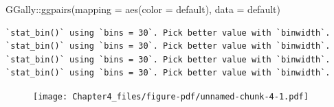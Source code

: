 \documentclass[
  letterpaper,
  DIV=11,
  numbers=noendperiod]{scrreprt}
\newenvironment{Shaded}{\begin{snugshade}}{\end{snugshade}}
\newcommand{\AttributeTok}[1]{\textcolor[rgb]{0.65,0.35,0.00}{#1}}
\newcommand{\FunctionTok}[1]{\textcolor[rgb]{0.02,0.16,0.49}{#1}}
\newcommand{\NormalTok}[1]{\textcolor[rgb]{0.33,0.33,0.33}{#1}}
\newcommand{\SpecialCharTok}[1]{\textcolor[rgb]{0.00,0.46,0.62}{#1}}
\begin{document}
\begin{Shaded}
\begin{Highlighting}[]
\NormalTok{GGally}\SpecialCharTok{::}\FunctionTok{ggpairs}\NormalTok{(}\AttributeTok{mapping =} \FunctionTok{aes}\NormalTok{(}\AttributeTok{color =}\NormalTok{ default), }\AttributeTok{data =}\NormalTok{ default)}
\end{Highlighting}
\end{Shaded}

\begin{verbatim}
`stat_bin()` using `bins = 30`. Pick better value with `binwidth`.
`stat_bin()` using `bins = 30`. Pick better value with `binwidth`.
`stat_bin()` using `bins = 30`. Pick better value with `binwidth`.
`stat_bin()` using `bins = 30`. Pick better value with `binwidth`.
\end{verbatim}

\begin{figure}[H]

{\centering \texttt{[image: Chapter4\_files/figure-pdf/unnamed-chunk-4-1.pdf]}

}

\end{figure}
\end{document}
